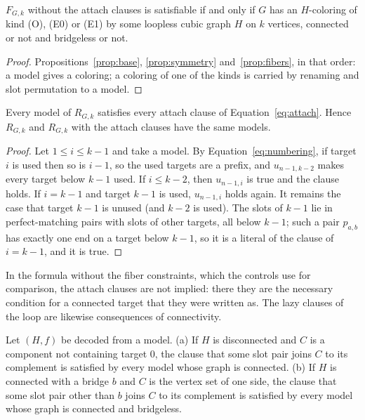\begin{theorem}\label{thm:encoding}
$F_{G,k}$ without the attach clauses is satisfiable if and only if $G$ has an $H$-coloring of kind (O), (E0) or (E1) by some loopless cubic graph $H$ on $k$ vertices, connected or not and bridgeless or not.
\end{theorem}

\begin{proof}
Propositions~\ref{prop:base}, \ref{prop:symmetry} and~\ref{prop:fibers}, in that order: a model gives a coloring; a coloring of one of the kinds is carried by renaming and slot permutation to a model.
\end{proof}

\begin{proposition}\label{prop:attach}
Every model of $R_{G,k}$ satisfies every attach clause of Equation~\eqref{eq:attach}. Hence $R_{G,k}$ and $R_{G,k}$ with the attach clauses have the same models.
\end{proposition}

\begin{proof}
Let $1 \le i \le k-1$ and take a model. By Equation~\eqref{eq:numbering}, if target $i$ is used then so is $i-1$, so the used targets are a prefix, and $u_{n-1,k-2}$ makes every target below $k-1$ used. If
$i \le k-2$, then $u_{n-1,i}$ is true and the clause holds. If $i = k-1$ and target $k-1$ is used, $u_{n-1,i}$ holds again. It remains the case that target $k-1$ is unused (and $k-2$ is used). The slots of
$k-1$ lie in perfect-matching pairs with slots of other targets, all below $k-1$; such a pair $p_{a,b}$ has exactly one end on a target below $k-1$, so it is a literal of the clause of $i = k-1$, and it is true.
\end{proof}

In the formula without the fiber constraints, which the controls use for comparison, the attach clauses are not implied: there they are the necessary condition for a connected target that they
were written as. The lazy clauses of the loop are likewise consequences of connectivity.

\begin{proposition}\label{prop:cuts}
Let $(H,f)$ be decoded from a model. (a) If $H$ is disconnected and $C$ is a component not containing target 0, the clause that some slot pair joins $C$ to its complement is satisfied by every
model whose graph is connected. (b) If $H$ is connected with a bridge $b$ and $C$ is the vertex set of one side, the clause that some slot pair other than $b$ joins $C$ to its complement is satisfied by every model whose graph is connected and bridgeless.
\end{proposition}

